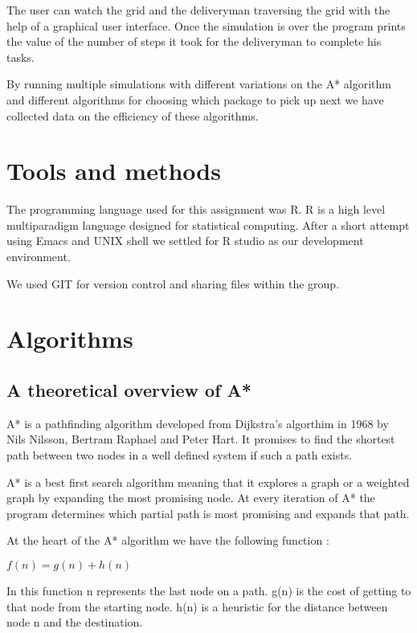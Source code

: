\documentclass[12pt, a4paper]{article}
\begin{document}
The user can watch the grid and the deliveryman traversing the grid with the help of a graphical user interface. Once the simulation is over the program prints the value of the number of steps it took for the deliveryman to complete his tasks. 

By running multiple simulations with different variations on the A* algorithm and different algorithms for choosing which package to pick up next we have collected data on the efficiency of these algorithms.

\section{Tools and methods}

The programming language used for this assignment was R. R is a high level multiparadigm language designed for statistical computing. After a short attempt using Emacs and UNIX shell we settled for R studio as our development environment. 

We used GIT for version control and sharing files within the group. 

\section{Algorithms}

\subsection{A theoretical overview of A*}

A* is a pathfinding algorithm developed from Dijkstra’s algorthim in 1968 by Nils Nilsson, Bertram Raphael and Peter Hart. It promises to find the shortest path between two nodes in a well defined system if such a path exists. 

A* is a best first search algorithm meaning that it explores a graph or a weighted graph by expanding the most promising node. At every iteration of A* the program determines which partial path is most promising and expands that path. 

At the heart of the A* algorithm we have the following function :

\begin{center}
$f(n) = g(n) + h(n)$
\end{center}

In this function n represents the last node on a path. g(n) is the cost of getting to that node from the starting node. h(n) is a heuristic for the distance between node n and the destination. 
\end{document}
